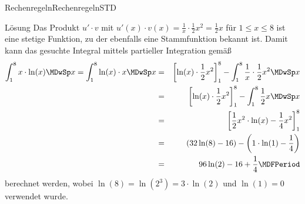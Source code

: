 \begin{MXContent}{Rechenregeln}{Rechenregeln}{STD}
\begin{MCOSHZusatz}
\begin{MExercise}
\begin{MHint}{Lösung}
Das Produkt $u' \cdot v$ mit 
$u'(x) \cdot v(x) = \frac{1}{x} \cdot \frac{1}{2} x^2 = \frac{1}{2} x$ 
für $1 \leq x \leq 8$ ist eine stetige Funktion, zu der ebenfalls eine 
Stammfunktion bekannt ist. Damit kann das gesuchte Integral mittels 
partieller Integration gemäß
\begin{eqnarray*}
\int_{1}^{8} x \cdot \ln(x) \MDwSp x %
 = \int_{1}^{8} \ln(x) \cdot x \MDwSp x %
& = & \left[ \ln(x) \cdot \frac{1}{2} x^2 \right]_{1}^{8} %
      - \int_{1}^{8} \frac{1}{x} \cdot \frac{1}{2} x^2 \MDwSp x \\
& = & \left[ \ln(x) \cdot \frac{1}{2} x^2 \right]_{1}^{8} %
      - \int_{1}^{8} \frac{1}{2} x \MDwSp x \\
& = & \left[ \frac{1}{2} x^2 \cdot \ln(x) - \frac{1}{4} x^2 \right]_{1}^{8} \\
& = & \left(32 \ln(8) - 16\right) - \left(1 \cdot \ln(1) - \frac{1}{4}\right) \\
& = & 96 \ln(2) - 16 + \frac{1}{4} \MDFPeriod %
\end{eqnarray*}
berechnet werden, wobei $\ln(8) = \ln(2^3) = 3 \cdot \ln(2)$ und $\ln(1) = 0$ 
verwendet wurde.
\end{MHint}
\end{MExercise}
\end{MCOSHZusatz}

\end{MXContent}


